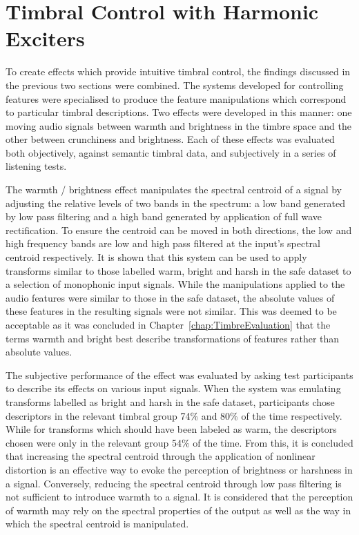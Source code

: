 \section{Timbral Control with Harmonic Exciters}
\label{sec:Conclusion-TimbralControl}
	To create effects which provide intuitive timbral control, the findings discussed in the previous two sections were
	combined. The systems developed for controlling features were specialised to produce the feature manipulations which
	correspond to particular timbral descriptions. Two effects were developed in this manner: one moving audio signals
	between warmth and brightness in the timbre space and the other between crunchiness and brightness. Each of these
	effects was evaluated both objectively, against semantic timbral data, and subjectively in a series of listening
	tests.

	The warmth / brightness effect manipulates the spectral centroid of a signal by adjusting the relative levels of two
	bands in the spectrum: a low band generated by low pass filtering and a high band generated by application of full
	wave rectification. To ensure the centroid can be moved in both directions, the low and high frequency bands are low
	and high pass filtered at the input's spectral centroid respectively. It is shown that this system can be used to
	apply transforms similar to those labelled warm, bright and harsh in the \acrshort{safe} dataset to a selection of
	monophonic input signals. While the manipulations applied to the audio features were similar to those in the
	\acrshort{safe} dataset, the absolute values of these features in the resulting signals were not similar. This was
	deemed to be acceptable as it was concluded in Chapter~\ref{chap:TimbreEvaluation} that the terms warmth and bright
	best describe transformations of features rather than absolute values.

	The subjective performance of the effect was evaluated by asking test participants to describe its effects on
	various input signals. When the system was emulating transforms labelled as bright and harsh in the \acrshort{safe}
	dataset, participants chose descriptors in the relevant timbral group 74\% and 80\% of the time respectively. While
	for transforms which should have been labeled as warm, the descriptors chosen were only in the relevant group 54\%
	of the time. From this, it is concluded that increasing the spectral centroid through the application of nonlinear
	distortion is an effective way to evoke the perception of brightness or harshness in a signal. Conversely, reducing
	the spectral centroid through low pass filtering is not sufficient to introduce warmth to a signal. It is considered
	that the perception of warmth may rely on the spectral properties of the output as well as the way in which the
	spectral centroid is manipulated.

